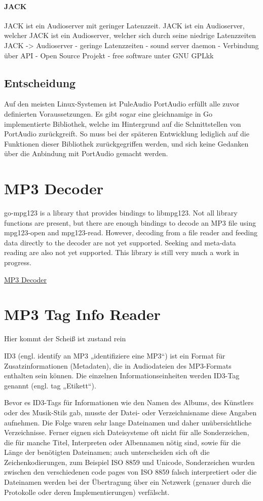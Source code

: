\paragraph{JACK}
JACK ist ein Audioserver mit geringer Latenzzeit. 
JACK ist ein Audioserver, welcher 
JACK ist ein Audioserver, welcher sich durch seine niedrige Latenzzeiten 
JACK -> Audioserver
- geringe Latenzzeiten
- sound server daemon
- Verbindung über API
- Open Source Projekt
- free software unter GNU GPLkk

\subsection{Entscheidung}
Auf den meisten Linux-Systemen ist PuleAudio
PortAudio erfüllt alle zuvor definierten Voraussetzungen. Es gibt sogar eine
gleichnamige in Go implementierte Bibliothek, welche im Hintergrund auf die
Schnittstellen von PortAudio zurückgreift. So muss bei der späteren Entwicklung
lediglich auf die Funktionen dieser Bibliothek zurückgegriffen werden, und sich
keine Gedanken über die Anbindung mit PortAudio gemacht werden. 

\section{MP3 Decoder}
go-mpg123 is a library that provides bindings to libmpg123.
Not all library functions are present, but there are enough bindings to decode an MP3 file using mpg123-open and mpg123-read. However, decoding from a file reader and feeding data directly to the decoder are not yet supported. Seeking and meta-data reading are also not yet supported.
This library is still very much a work in progress.

\href{https://github.com/bobertlo/go-mpg123}{MP3 Decoder}

\section{MP3 Tag Info Reader}
Hier kommt der Scheiß ist zustand rein

ID3 (engl. identify an MP3 „identifiziere eine MP3“) ist ein Format für Zusatzinformationen (Metadaten), die in Audiodateien des MP3-Formats enthalten sein können. Die einzelnen Informationseinheiten werden ID3-Tag genannt (engl. tag „Etikett“).

Bevor es ID3-Tags für Informationen wie den Namen des Albums, des Künstlers oder des Musik-Stils gab, musste der Datei- oder Verzeichnisname diese Angaben aufnehmen. Die Folge waren sehr lange Dateinamen und daher unübersichtliche Verzeichnisse. Ferner eignen sich Dateisysteme oft nicht für alle Sonderzeichen, die für manche Titel, Interpreten oder Albennamen nötig sind, sowie für die Länge der benötigten Dateinamen; auch unterscheiden sich oft die Zeichenkodierungen, zum Beispiel ISO 8859 und Unicode, Sonderzeichen wurden zwischen den verschiedenen code pages von ISO 8859 falsch interpretiert oder die Dateinamen werden bei der Übertragung über ein Netzwerk (genauer durch die Protokolle oder deren Implementierungen) verfälscht.


